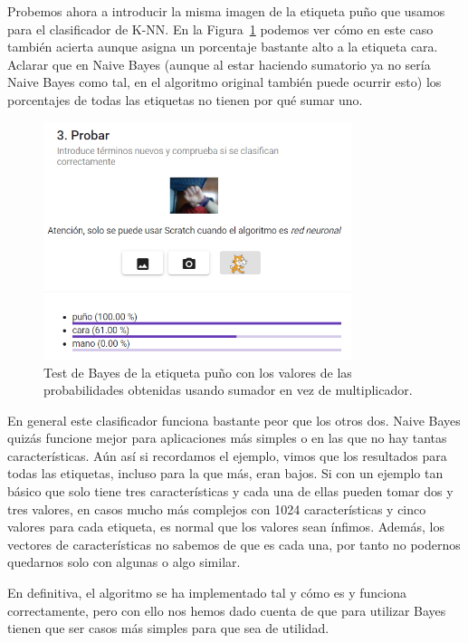 \documentclass[a4paper, 12pt]{book}
\begin{document}
Probemos ahora a introducir la misma imagen de la etiqueta puño que usamos para el clasificador de K-NN. En la Figura~\ref{fig:bayestestpuno} podemos ver cómo en este caso también acierta aunque asigna un porcentaje bastante alto a la etiqueta cara. Aclarar que en Naive Bayes (aunque al estar haciendo sumatorio ya no sería Naive Bayes como tal, en el algoritmo original también puede ocurrir esto) los porcentajes de todas las etiquetas no tienen por qué sumar uno.

\begin{figure}
	\centering
	\includegraphics[width=9cm, keepaspectratio]{img/bayestestpuno}
	\caption{Test de Bayes de la etiqueta puño con los valores de las probabilidades obtenidas usando sumador en vez de multiplicador.}			
	\label{fig:bayestestpuno}
\end{figure}

En general este clasificador funciona bastante peor que los otros dos. Naive Bayes quizás funcione mejor para aplicaciones más simples o en las que no hay tantas características. Aún así si recordamos el ejemplo, vimos que los resultados para todas las etiquetas, incluso para la que más, eran bajos. Si con un ejemplo tan básico que solo tiene tres características y cada una de ellas pueden tomar dos y tres valores, en casos mucho más complejos con 1024 características y cinco valores para cada etiqueta, es normal que los valores sean ínfimos. Además, los vectores de características no sabemos de que es cada una, por tanto no podernos quedarnos solo con algunas o algo similar.
 
En definitiva, el algoritmo se ha implementado tal y cómo es y funciona correctamente, pero con ello nos hemos dado cuenta de que para utilizar Bayes tienen que ser casos más simples para que sea de utilidad.



\end{document}
